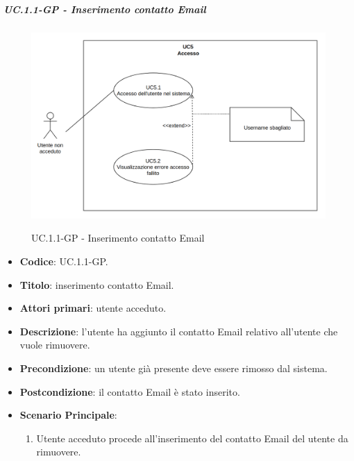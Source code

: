 			\subparagraph{UC\theuccount.1.1-GP - Inserimento contatto Email}
				\begin{figure}[H]
					\centering
					\includegraphics[width=\columnwidth]{img/UC5.png}\\
					\caption{UC\theuccount.1.1-GP - Inserimento contatto Email}
				\end{figure}
				\begin{itemize}
					\item \textbf{Codice}: UC\theuccount.1.1-GP.
					\item \textbf{Titolo}: inserimento contatto Email.
					\item \textbf{Attori primari}: utente acceduto.
					\item \textbf{Descrizione}: l'utente ha aggiunto il contatto Email relativo all'utente che vuole rimuovere.
					\item \textbf{Precondizione}: un utente già presente deve essere rimosso dal sistema.
					\item \textbf{Postcondizione}: il contatto Email è stato inserito.
					\item \textbf{Scenario Principale}:
					\begin{enumerate}
						\item Utente acceduto procede all'inserimento del contatto Email del utente da rimuovere.
					\end{enumerate}
				\end{itemize}

